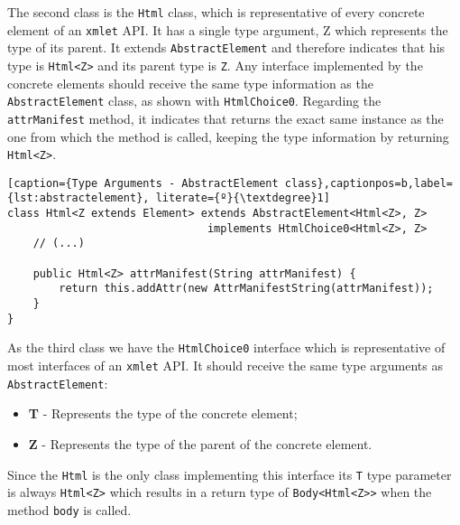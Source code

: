 \noindent
The second class is the \texttt{Html} class, which is representative of every concrete element of an \texttt{xmlet} \ac{API}. It has a single type argument, Z which represents the type of its parent. It extends \texttt{AbstractElement} and therefore indicates that his type is \texttt{Html<Z>} and its parent type is \texttt{Z}. Any  interface implemented by the concrete elements should receive the same type information as the \texttt{AbstractElement} class, as shown with \texttt{HtmlChoice0}. Regarding the \texttt{attrManifest} method, it indicates that returns the exact same instance as the one from which the method is called, keeping the type information by returning \texttt{Html<Z>}.

\bigskip


\begin{minipage}{\linewidth}
\begin{lstlisting}[caption={Type Arguments - AbstractElement class},captionpos=b,label={lst:abstractelement}, literate={º}{\textdegree}1]
class Html<Z extends Element> extends AbstractElement<Html<Z>, Z>
                               implements HtmlChoice0<Html<Z>, Z>
    // (...)
    
    public Html<Z> attrManifest(String attrManifest) {
        return this.addAttr(new AttrManifestString(attrManifest));
    }
}
\end{lstlisting}
\end{minipage}

\noindent
As the third class we have the \texttt{HtmlChoice0} interface which is representative of most interfaces of an \texttt{xmlet} \ac{API}. It should receive the same type arguments as \texttt{AbstractElement}:

\begin{itemize}
	\item \textbf{T} - Represents the type of the concrete element; 
	\item \textbf{Z} - Represents the type of the parent of the concrete element.
\end{itemize}	

\noindent
Since the \texttt{Html} is the only class implementing this interface its \texttt{T} type parameter is always \texttt{Html<Z>} which results in a return type of \texttt{Body<Html<Z>}\texttt{>} when the method \texttt{body} is called. 


